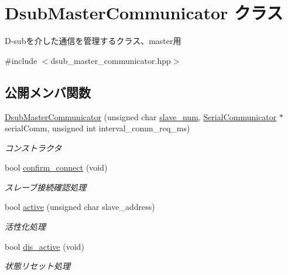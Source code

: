 \hypertarget{class_dsub_master_communicator}{}\section{Dsub\+Master\+Communicator クラス}
\label{class_dsub_master_communicator}


D-\/subを介した通信を管理するクラス、master用  




{\ttfamily \#include $<$dsub\+\_\+master\+\_\+communicator.\+hpp$>$}

\subsection*{公開メンバ関数}
\begin{DoxyCompactItemize}
\item 
\mbox{\hyperlink{class_dsub_master_communicator_af0d5f28218bbcfc0f93f195a0c6c3df6}{Dsub\+Master\+Communicator}} (unsigned char \mbox{\hyperlink{start__module_8ino_a74d30eb4a8cad665a32a15dbee48837f}{slave\+\_\+num}}, \mbox{\hyperlink{class_serial_communicator}{Serial\+Communicator}} $\ast$serial\+Comm, unsigned int interval\+\_\+comm\+\_\+req\+\_\+ms)
\begin{DoxyCompactList}\small\item\em コンストラクタ \end{DoxyCompactList}\item 
bool \mbox{\hyperlink{class_dsub_master_communicator_acb3acb522c4ff0099044fe9451008864}{confirm\+\_\+connect}} (void)
\begin{DoxyCompactList}\small\item\em スレーブ接続確認処理 \end{DoxyCompactList}\item 
bool \mbox{\hyperlink{class_dsub_master_communicator_a326013bfa0efeba26958317ce38706ac}{active}} (unsigned char slave\+\_\+address)
\begin{DoxyCompactList}\small\item\em 活性化処理 \end{DoxyCompactList}\item 
bool \mbox{\hyperlink{class_dsub_master_communicator_ac0a9298c691adbdf844f85d680d7e554}{dis\+\_\+active}} (void)
\begin{DoxyCompactList}\small\item\em 状態リセット処理 \end{DoxyCompactList}\item 

\end{DoxyCompactItemize}
